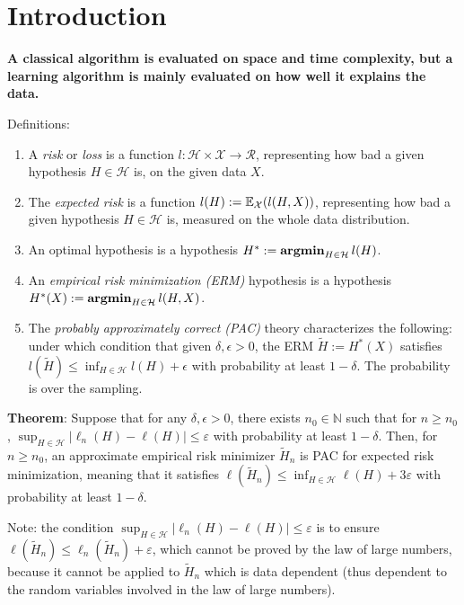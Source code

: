 \section{Introduction}

\textbf{A classical algorithm is evaluated on space and time complexity, but a learning algorithm is mainly evaluated on how well it explains the data.}

Definitions:
\begin{enumerate}
    \item A \textit{risk} or \textit{loss} is a function $l: \mathcal{H} \times \mathcal{X} \rightarrow \mathcal{R}$, representing how bad a given hypothesis $H \in \mathcal{H}$ is, on the given data $X$.
    \item The \emph{expected risk} is a function $l(H) := \mathbb{E}_\mathcal{X} (l(H, X))$, representing how bad a given hypothesis $H \in \mathcal{H}$ is, measured on the whole data distribution.
    \item An optimal hypothesis is a hypothesis $H^* := \operatorname{\textbf{argmin}}_{H\in\mathcal{H}} l(H)$.
    \item An \emph{empirical risk minimization (ERM)} hypothesis is a hypothesis $H^*(X):= \operatorname{\textbf{argmin}}_{H\in\mathcal{H}} l(H, X)$.
    \item The \emph{probably approximately correct (PAC)} theory characterizes the following: under which condition that given $\delta, \epsilon>0$, the ERM $\tilde{H}:=H^*(X)$ satisfies $l(\tilde{H}) \le \inf_{H\in \mathcal{H}} l(H) +\epsilon$ with probability at least $1-\delta$. The probability is over the sampling.
\end{enumerate}

\textbf{Theorem}: Suppose that for any $\delta, \epsilon>0$, there exists $n_{0} \in \mathbb{N}$ such that for $n \geq n_{0}$,
$
\sup _{H \in \mathcal{H}}\left|\ell_{n}(H)-\ell(H)\right| \leq \varepsilon
$
with probability at least $1-\delta$. Then, for $n \geq n_{0}$, an approximate empirical risk minimizer $\tilde{H}_{n}$ is PAC for expected risk minimization, meaning that it satisfies
$
\ell\left(\tilde{H}_{n}\right) \leq \inf _{H \in \mathcal{H}} \ell(H)+3 \varepsilon
$
with probability at least $1-\delta$.

Note: the condition $\sup _{H \in \mathcal{H}}\left|\ell_{n}(H)-\ell(H)\right| \leq \varepsilon$ is to ensure $\ell\left(\tilde{H}_{n}\right) \leq \ell_{n}\left(\tilde{H}_{n}\right)+\varepsilon$, which cannot be proved by the law of large numbers, because it cannot be applied to $\tilde{H}_{n}$ which is data dependent (thus dependent to the random variables involved in the law of large numbers).

